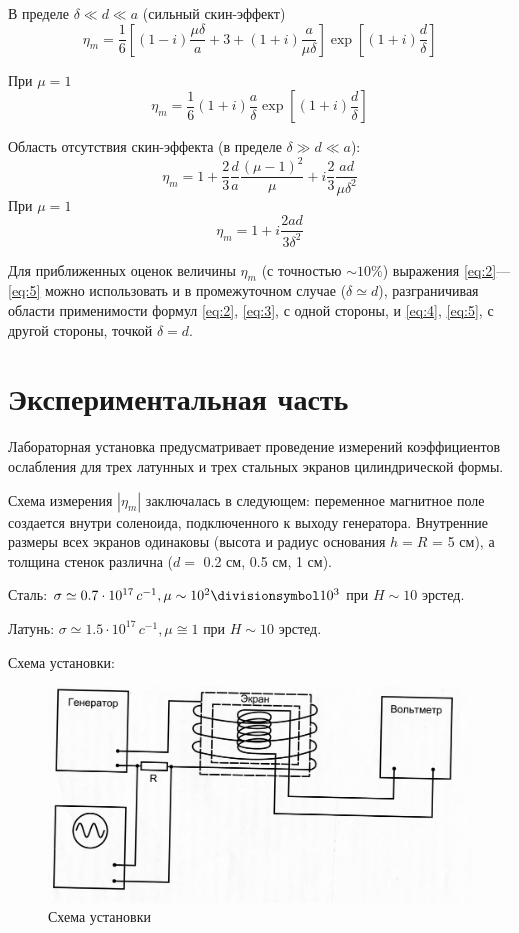 В пределе $\delta \ll d \ll a$ (сильный скин-эффект)
	\begin{equation} 
		\eta_{m}=\frac{1}{6}\left[(1-i) \frac{\mu \delta}{a}+3+(1+i) \frac{a}{\mu \delta}\right] \exp \left[(1+i) \frac{d}{\delta}\right]
	\label{eq:2}
	\end{equation}

При $\mu=1$
\begin{equation} 
	\eta_{m}=\frac{1}{6}(1+i) \frac{a}{\delta} \exp \left[(1+i) \frac{d}{\delta}\right]
\label{eq:3}
\end{equation}

Область отсутствия скин-эффекта (в пределе $\delta \gg d \ll a$):
	\begin{equation}
		\eta_{m}=1+\frac{2}{3}\frac{d}{a}\frac{(\mu-1)^2}{\mu}+i\frac{2}{3}\frac{ad}{\mu \delta^2}
	\label{eq:4}
	\end{equation}
При $\mu=1$
\begin{equation} 
\eta_{m}=1+i \frac{2 a d}{3 \delta^{2}}
\label{eq:5}
\end{equation}

Для приближенных оценок величины $\eta_{m}$ (с точностью $\sim10\%$) выражения \eqref{eq:2}—\eqref{eq:5} можно использовать и в промежуточном случае ($\delta \simeq d$), разграничивая области применимости формул \eqref{eq:2}, \eqref{eq:3}, с одной стороны, и \eqref{eq:4}, \eqref{eq:5}, с другой стороны, точкой $\delta = d$.

\newpage
\section{Экспериментальная часть}
Лабораторная установка предусматривает проведение измерений коэффициентов ослабления для трех латунных и трех стальных экранов цилиндрической формы. 

Схема измерения $|\eta_m|$ заключалась в следующем: переменное магнитное поле создается внутри соленоида, подключенного к выходу генератора. Внутренние размеры всех экранов одинаковы (высота и радиус основания $h=R$ = 5 см), а толщина стенок различна ($d=$ 0.2 см, 0.5 см, 1 см). 

Сталь: $\sigma \simeq 0.7\cdot 10^{17} \,c^{-1}, \mu \sim 10^2 \divisionsymbol 10^3 $ при $H \sim 10$ эрстед.

Латунь: $\sigma \simeq 1.5\cdot 10^{17}\, c^{-1}, \mu \cong 1$ при $H \sim 10$ эрстед.

Схема установки:
\begin{figure}[H]
    \centering
    \includegraphics[width = 0.9\linewidth]{imgs/graphs/img744.jpg}
    \caption{Схема установки}
    \label{fig:1}
\end{figure}

